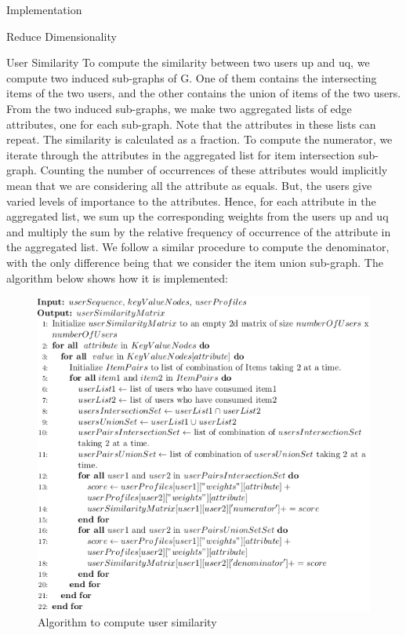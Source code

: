 \documentclass{report}
\begin{document}
\begin{projChapter}{Implementation}
\begin{projSection}{Reduce Dimensionality}
\end{projSection}
\begin{projSection}{User Similarity}
            To compute the similarity between two users up and uq, we compute two induced sub-graphs of G. One of them contains the intersecting items of the two users, and the other contains the union of items of the two users. From the two induced sub-graphs, we make two aggregated lists of edge attributes, one for each sub-graph. Note that the attributes in these lists can repeat. The similarity is calculated as a fraction. To compute the numerator, we iterate through the attributes in the aggregated list for item intersection sub-graph. Counting the number of occurrences of these attributes would implicitly mean that we are considering all the attribute as equals. But, the users give varied levels of importance to the attributes. Hence, for each attribute in the aggregated list, we sum up the corresponding weights from the users up and uq and multiply the sum by the relative frequency of occurrence of the attribute in the aggregated list. We follow a similar procedure to compute the denominator, with the only difference being that we consider the item union sub-graph. The algorithm below shows how it is implemented:
            \begin{figure}[ht!]
\centering
\includegraphics[scale=0.6]{images/userSimilarity.png}
\caption{Algorithm to compute user similarity}
\label{userSimilarity}
\end{figure}


\end{projSection}
\end{projChapter}
\end{document}
